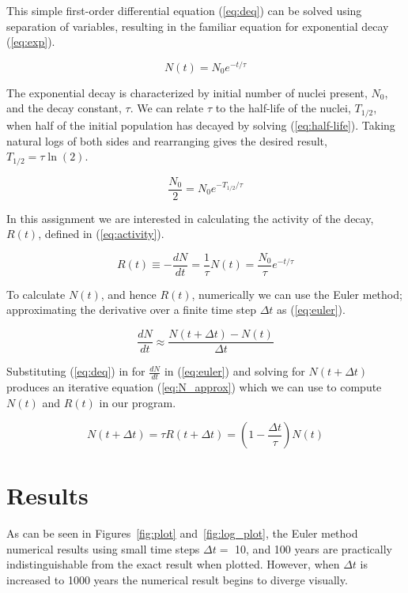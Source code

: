 \documentclass[notitlepage,aps,prd,nofootinbib]{revtex4-1}
\begin{document}
This simple first-order differential equation (\ref{eq:deq}) can be solved using separation of variables, resulting in the familiar equation for exponential decay (\ref{eq:exp}).

\begin{equation} \label{eq:exp}
N\left(t\right) = N_{0} e^{-t/\tau}
\end{equation}

The exponential decay is characterized by initial number of nuclei present, $N_{0}$, and the decay constant, $\tau$. We can relate $\tau$ to the half-life of the nuclei, $T_{1/2}$, when half of the initial population has decayed by solving (\ref{eq:half-life}). Taking natural logs of both sides and rearranging gives the desired result, $T_{1/2} = \tau \ln\left(2\right)$.


\begin{equation} \label{eq:half-life}
\frac{N_{0}}{2} = N_{0} e^{-T_{1/2}/\tau}
\end{equation}

In this assignment we are interested in calculating the activity of the decay, $R\left(t\right)$, defined in (\ref{eq:activity}).

\begin{equation} \label{eq:activity}
R\left(t\right) \equiv -\frac{d N}{d t} = \frac{1}{\tau} N\left(t\right) = \frac{N_{0}}{\tau} e^{-t/\tau}
\end{equation}

To calculate $N\left(t\right)$, and hence $R\left(t\right)$, numerically we can use the Euler method; approximating the derivative over a finite time step $\Delta t$ as (\ref{eq:euler}).

\begin{equation} \label{eq:euler}
\frac{d N}{d t} \approx \frac{N\left(t+\Delta t\right)-N\left(t\right)}{\Delta t}
\end{equation}

Substituting (\ref{eq:deq}) in for $\frac{d N}{d t}$ in (\ref{eq:euler}) and solving for $N\left(t+\Delta t\right)$ produces an iterative equation (\ref{eq:N_approx}) which we can use to compute $N\left(t\right)$ and $R\left(t\right)$ in our program.

\begin{equation} \label{eq:N_approx}
N\left(t+\Delta t\right) = \tau R\left(t+\Delta t\right) = \left(1-\frac{\Delta t}{\tau}\right) N\left(t\right)
\end{equation}


\section{Results}
\label{sec:results}
As can be seen in Figures~\ref{fig:plot} and~\ref{fig:log_plot}, the Euler method numerical results using small time steps $\Delta t =$ 10, and 100 years are practically indistinguishable from the exact result when plotted. However, when $\Delta t$ is increased to 1000 years the numerical result begins to diverge visually.
\end{document}
